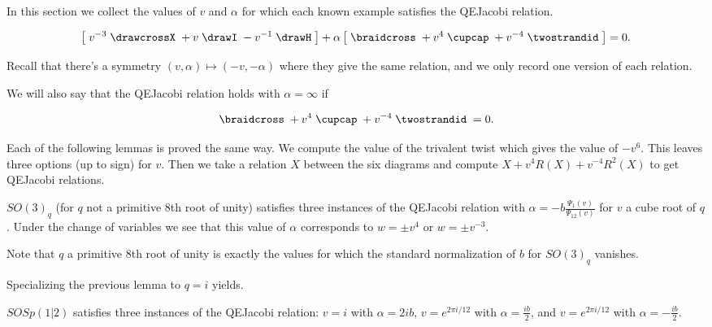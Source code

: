 \documentclass[12pt]{amsart}
\begin{document}
In this section we collect the values of $v$ and $\alpha$ for which each known example satisfies the QEJacobi relation.  

\begin{equation*}
\left[\; v^{-3} \;
\drawcrossX
\;+ v \;
\drawI
\; -v^{-1} \;
 \drawH
\;\right]
 + \alpha
\left[\; \braidcross \;
 + v^{4}\;
\cupcap
\; + v^{-4} \;
 \twostrandid \;
 \right] = 0.
 \end{equation*}
 
Recall that there's a symmetry $(v,\alpha) \mapsto (-v,-\alpha)$ where they give the same relation, and we only record one version of each relation.

We will also say that the QEJacobi relation holds with $\alpha=\infty$ if

\begin{equation*}
\braidcross \;
 + v^{4}\;
\cupcap
\; + v^{-4} \;
 \twostrandid \;= 0.
 \end{equation*}

Each of the following lemmas is proved the same way.  We compute the value of the trivalent twist which gives the value of $-v^6$.  This leaves three options (up to sign) for $v$.  Then we take a relation $X$ between the six diagrams and compute $X+v^{4} R(X)+ v^{-4}R^2(X)$ to get QEJacobi relations. 

\begin{lemma}
$SO(3)_q$ (for $q$ not a primitive $8$th root of unity) satisfies three instances of the QEJacobi relation with $\alpha = -b \frac{\Psi_1(v)}{\Psi_{12}(v)} $ for $v$ a cube root of $q$.  Under the change of variables we see that this value of $\alpha$ corresponds to $w = \pm v^4$ or $w = \pm v^{-3}$.
\end{lemma}

Note that $q$ a primitive $8$th root of unity is exactly the values for which the standard normalization of $b$ for $SO(3)_q$ vanishes.  

Specializing the previous lemma to $q=i$ yields.

\begin{lemma}
$SOSp(1|2)$ satisfies three instances of the QEJacobi relation: $v=i$ with $\alpha = 2 i b$, $v = e^{2 \pi i/12}$ with $\alpha = \frac{i b}{2}$, and $v=e^{2 \pi i/12}$ with $\alpha = -\frac{i b}{2}$.
\end{lemma}
\end{document}
